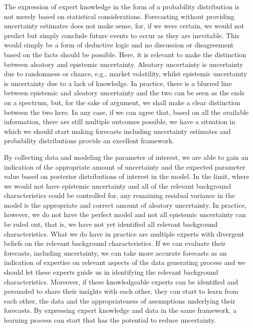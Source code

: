 \documentclass[openright,titlepage,12pt,a4paper]{book}
\begin{document}
The expression of expert knowledge in the form of a probability distribution is not merely based on statistical considerations. Forecasting without providing uncertainty estimates does not make sense, for, if we were certain, we would not predict but simply conclude future events to occur as they are inevitable. This would simply be a form of deductive logic and no discussion or disagreement based on the facts should be possible. Here, it is relevant to make the distinction between aleatory and epistemic uncertainty. Aleatory uncertainty is uncertainty due to randomness or chance, e.g., market volatility, whilst epistemic uncertainty is uncertainty due to a lack of knowledge. In practice, there is a blurred line between epistemic and aleatory uncertainty and the two can be seen as the ends on a spectrum, but, for the sake of argument, we shall make a clear distinction between the two here. In any case, if we can agree that, based on all the available information, there are still multiple outcomes possible, we have a situation in which we should start making forecasts including uncertainty estimates and probability distributions provide an excellent framework.

By collecting data and modeling the parameter of interest, we are able to gain an indication of the appropriate amount of uncertainty and the expected parameter value based on posterior distributions of interest in the model. In the limit, where we would not have epistemic uncertainty and all of the relevant background characteristics could be controlled for, any remaining residual variance in the model is the appropriate and correct amount of aleatory uncertainty. In practice, however, we do not have the perfect model and not all epistemic uncertainty can be ruled out, that is, we have not yet identified all relevant background characteristics. What we do have in practice are multiple experts with divergent beliefs on the relevant background characteristics. If we can evaluate their forecasts, including uncertainty, we can take more accurate forecasts as an indication of expertise on relevant aspects of the data generating process and we should let these experts guide us in identifying the relevant background characteristics. Moreover, if these knowledgeable experts can be identified and persuaded to share their insights with each other, they can start to learn from each other, the data and the appropriateness of assumptions underlying their forecasts. By expressing expert knowledge and data in the same framework, a learning process can start that has the potential to reduce uncertainty.
\end{document}
